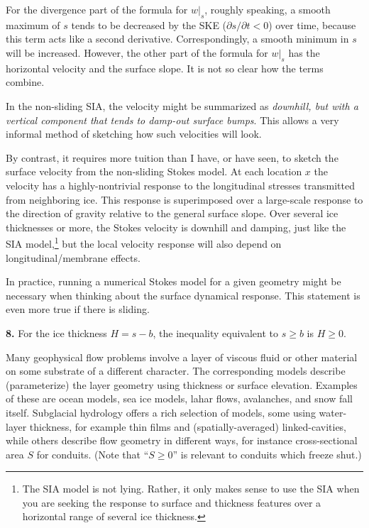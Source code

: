 \documentclass[12pt]{amsart}
\newcommand{\prob}[1]{\bigskip\noindent\textbf{#1.}\quad }
\begin{document}
For the divergence part of the formula for $w|_s$, roughly speaking, a smooth maximum of $s$ tends to be decreased by the SKE ($\partial s/\partial t < 0$) over time, because this term acts like a second derivative.  Correspondingly, a smooth minimum in $s$ will be increased.  However, the other part of the formula for $w|_s$ has the horizontal velocity and the surface slope.  It is not so clear how the terms combine.

In the non-sliding SIA, the velocity might be summarized as \emph{downhill, but with a vertical component that tends to damp-out surface bumps}.  This allows a very informal method of sketching how such velocities will look.

By contrast, it requires more tuition than I have, or have seen, to sketch the surface velocity from the non-sliding Stokes model.  At each location $x$ the velocity has a highly-nontrivial response to the longitudinal stresses transmitted from neighboring ice.  This response is superimposed over a large-scale response to the direction of gravity relative to the general surface slope.  Over several ice thicknesses or more, the Stokes velocity is downhill and damping, just like the SIA model,\footnote{The SIA model is not lying.  Rather, it only makes sense to use the SIA when you are seeking the response to surface and thickness features over a horizontal range of several ice thickness.} but the local velocity response will also depend on longitudinal/membrane effects.

In practice, running a numerical Stokes model for a given geometry might be necessary when thinking about the surface dynamical response.  This statement is even more true if there is sliding.


\prob{8}  For the ice thickness $H=s-b$, the inequality equivalent to $s\ge b$ is $H\ge 0$.

Many geophysical flow problems involve a layer of viscous fluid or other material on some substrate of a different character.  The corresponding models describe (parameterize) the layer geometry using thickness or surface elevation.  Examples of these are ocean models, sea ice models, lahar flows, avalanches, and snow fall itself.  Subglacial hydrology offers a rich selection of models, some using water-layer thickness, for example thin films and (spatially-averaged) linked-cavities, while others describe flow geometry in different ways, for instance cross-sectional area $S$ for conduits.  (Note that ``$S\ge 0$'' is relevant to conduits which freeze shut.)
\end{document}

